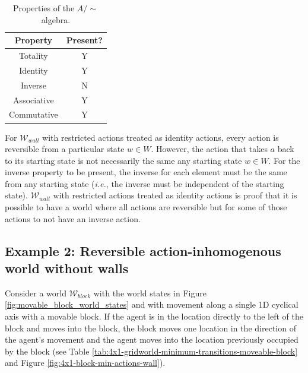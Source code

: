 \begin{table}[H]
    \centering
    \begin{tabular}{c|c}
        \textbf{Property}   & \textbf{Present?} \\
        \hline
        Totality            & Y\\
        Identity            & Y\\
        Inverse             & N\\
        Associative         & Y\\
        Commutative         & Y
    \end{tabular}
    \caption{Properties of the $A/\sim$ algebra.}
    \label{tab:identity-walls-properties}
\end{table}


For $\mathscr{W}_{wall}$ with restricted actions treated as identity actions, every action is reversible from a particular state $w \in W$.
However, the action that takes $a$ back to its starting state is not necessarily the same any starting state $w \in W$.
For the inverse property to be present, the inverse for each element must be the same from any starting state (\textit{i.e.}, the inverse must be independent of the starting state).
$\mathscr{W}_{wall}$ with restricted actions treated as identity actions is proof that it is possible to have a world where all actions are reversible but for some of those actions to not have an inverse action.


\subsection{Example 2: Reversible action-inhomogenous world without walls}

Consider a world $\mathscr{W}_{block}$ with the world states in Figure \ref{fig:movable_block_world_states} and with movement along a single 1D cyclical axis with a movable block.
If the agent is in the location directly to the left of the block and moves into the block, the block moves one location in the direction of the agent's movement and the agent moves into the location previously occupied by the block (see Table \ref{tab:4x1-gridworld-minimum-transitions-moveable-block} and Figure \ref{fig:4x1-block-min-actions-wall}).

